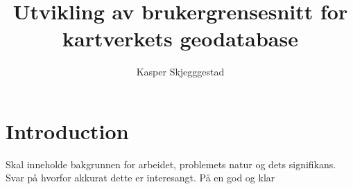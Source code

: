 \documentclass[a4paper,UKenglish]{article}
\title{Utvikling av brukergrensesnitt for kartverkets geodatabase}
\author{Kasper Skjegggestad}
\begin{document}
\maketitle
\tableofcontents

\section{Introduction}

Skal inneholde bakgrunnen for arbeidet, problemets natur og dets signifikans. 
Svar på hvorfor akkurat dette er interesangt. 
På en god og klar
\end{document}
